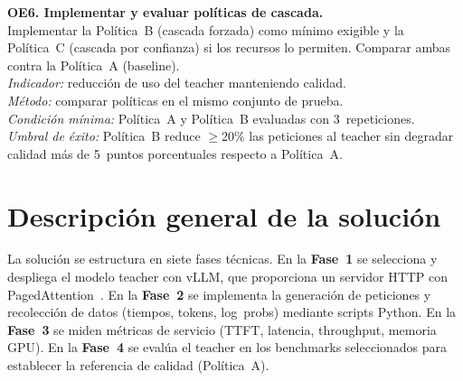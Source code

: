 \documentclass[11pt,a4paper]{article}
\begin{document}
\textbf{OE6. Implementar y evaluar políticas de cascada.}\\
Implementar la Política~B (cascada forzada) como mínimo exigible y la Política~C (cascada por confianza) si los recursos lo permiten. Comparar ambas contra la Política~A (baseline).\\
\textit{Indicador:} reducción de uso del teacher manteniendo calidad.\\
\textit{Método:} comparar políticas en el mismo conjunto de prueba.\\
\textit{Condición mínima:} Política~A y Política~B evaluadas con 3~repeticiones.\\
\textit{Umbral de éxito:} Política~B reduce $\geq$20\% las peticiones al teacher sin degradar calidad más de 5~puntos porcentuales respecto a Política~A.

\section{Descripción general de la solución}

La solución se estructura en siete fases técnicas. En la \textbf{Fase~1} se selecciona y despliega el modelo teacher con vLLM, que proporciona un servidor HTTP con PagedAttention~\cite{vllm2023}. En la \textbf{Fase~2} se implementa la generación de peticiones y recolección de datos (tiempos, tokens, log~probs) mediante scripts Python. En la \textbf{Fase~3} se miden métricas de servicio (TTFT, latencia, throughput, memoria GPU). En la \textbf{Fase~4} se evalúa el teacher en los benchmarks seleccionados para establecer la referencia de calidad (Política~A).
\end{document}
